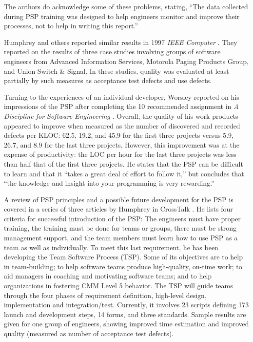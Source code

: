 \newpage
The authors do acknowledge some of these problems, stating, ``The data
collected during PSP training was designed to help engineers monitor and
improve their processes, not to help in writing this report.''

Humphrey and others reported similar results in 1997 {\it IEEE Computer}
\cite{Ferguson97}.  They reported on the results of three case studies
involving groups of software engineers from Advanced Information Services,
Motorola Paging Products Group, and Union Switch \& Signal. In these
studies, quality was evaluated at least partially by such measures as
acceptance test defects and use defects.

Turning to the experiences of an individual developer, Worsley reported on
his impressions of the PSP after completing the 10 recommended assignment
in {\it A Discipline for Software Engineering} \cite{Worsley96}.  Overall,
the quality of his work products appeared to improve when measured as the
number of discovered and recorded defects per KLOC: 62.5, 19.2, and 45.9
for the first three projects versus 5.9, 26.7, and 8.9 for the last three
projects.  However, this improvement was at the expense of productivity:
the LOC per hour for the last three projects was less than half that of the
first three projects.  He states that the PSP can be difficult to learn and
that it ``takes a great deal of effort to follow it,'' but concludes that
``the knowledge and insight into your programming is very rewarding.''

A review of PSP principles and a possible future development for the PSP is
covered in a series of three articles by Humphrey in CrossTalk
\cite{Humphrey98a} \cite{Humphrey98b} \cite{Humphrey98c}.  He lists four
criteria for successful introduction of the PSP: The engineers must have
proper training, the training must be done for teams or groups, there must
be strong management support, and the team members must learn how to use
PSP as a team as well as individually.  To meet this last requirement, he
has been developing the Team Software Process (TSP).  Some of its
objectives are to help in team-building; to help software teams produce
high-quality, on-time work; to aid managers in coaching and motivating
software teams; and to help organizations in fostering CMM Level 5
behavior.  The TSP will guide teams through the four phases of requirement
definition, high-level design, implementation and integration/test.
Currently, it involves 23 scripts defining 173 launch and development
steps, 14 forms, and three standards.  Sample results are given for one
group of engineers, showing improved time estimation and improved quality
(measured as number of acceptance test defects).


